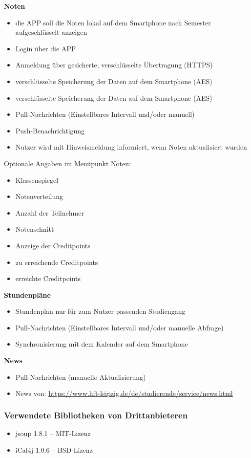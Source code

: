 \textbf{Noten}
\begin{itemize}
	\item die APP soll die Noten lokal auf dem Smartphone nach Semester aufgeschlüsselt anzeigen
	\item Login über die APP
	\item Anmeldung über gesicherte, verschlüsselte Übertragung (\acs{HTTPS})
	\item verschlüsselte Speicherung der Daten auf dem Smartphone (\acs{AES})
	\item verschlüsselte Speicherung der Daten auf dem Smartphone (\acs{AES})
	\item Pull-Nachrichten (Einstellbares Intervall und/oder manuell)
	\item Push-Benachrichtigung
	\item Nutzer wird mit Hinweismeldung informiert, wenn Noten aktualisiert wurden
\end{itemize}
Optionale Angaben im Menüpunkt Noten:
\begin{itemize}
	\item Klassenspiegel
	\item Notenverteilung
	\item Anzahl der Teilnehmer
	\item Notenschnitt
	\item Anzeige der Creditpoints
	\item zu erreichende Creditpoints
	\item erreichte Creditpoints
\end{itemize}
\textbf{Stundenpläne}
\begin{itemize}
	\item Stundenplan nur für zum Nutzer passenden Studiengang
	\item Pull-Nachrichten (Einstellbares Intervall und/oder manuelle Abfrage)
	\item Synchronisierung mit dem Kalender auf dem Smartphone	
\end{itemize}
\textbf{News}
\begin{itemize}
	\item Pull-Nachrichten (manuelle Aktualisierung)
	\item News von: \url{https://www.hft-leipzig.de/de/studierende/service/news.html}
\end{itemize}



\subsubsection{Verwendete Bibliotheken von Drittanbieteren}
\begin{itemize}
	\item jsoup 1.8.1 – MIT-Lizenz
	\item iCal4j 1.0.6 – BSD-Lizenz 
\end{itemize}


